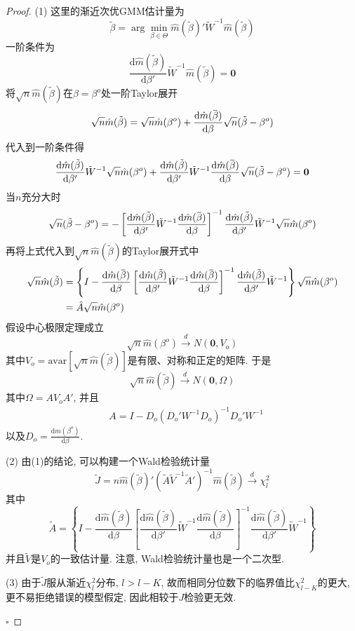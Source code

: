\documentclass[cn,12pt,math=mtpro2,citestyle=gb7714-2015,bibstyle=gb7714-2015,twocol,mode=simple]{elegantbook}
\newcommand{\overbar}[1]{\mkern 1.5mu\overline{\mkern-1.5mu#1\mkern-1.5mu}\mkern 1.5mu}
\newcommand{\tbeta}{\tilde{\beta}}
\newcommand{\hatm}{\hat{m}}
\newcommand{\dd}{\text{d}}
\begin{document}
\begin{proof}
  (1) 这里的渐近次优GMM估计量为
  $$\tbeta=\arg\min_{\beta\in\Theta}\hatm(\tbeta)'\tilde{W}^{-1}\hatm(\tbeta)$$
  一阶条件为
  $$\frac{\dd\hat{m}(\tbeta)}{\dd\beta'}\tilde{W}^{-1}\hatm(\tbeta)=\mathbf{0}$$
  将$\sqrt{n}\hatm(\tbeta)$在$\beta=\beta^o$处一阶Taylor展开
  $$\sqrt{n}\hatm(\tbeta)=\sqrt{n}\hatm(\beta^o)+\frac{\dd\hatm(\overbar{\beta})}{\dd\beta}\sqrt{n}(\tbeta-\beta^o)$$
  代入到一阶条件得
  $$\frac{\dd\hatm(\tbeta)}{\dd\beta'}\tilde{W}^{-1}\sqrt{n}\hatm(\beta^o)+\frac{\dd\hatm(\tbeta)}{\dd\beta'}\tilde{W}^{-1}\frac{\dd\hat{m}(\overbar{\beta})}{\dd\beta}\sqrt{n}(\tilde{\beta}-\beta^o)=\mathbf{0}$$
  当$n$充分大时
  $$\sqrt{n}(\tbeta-\beta^o)=-\left[\frac{\dd\hatm(\tbeta)}{\dd\beta'}\tilde{W}^{-1}\frac{\dd \hatm(\overbar{\beta})}{\dd\beta}\right]^{-1}\frac{\dd\hatm(\tilde{\beta})}{\dd\beta'}\tilde{W}^{-1}\sqrt{n}\hatm(\beta^o)$$
  再将上式代入到$\sqrt{n}\hatm(\tbeta)$的Taylor展开式中
  \begin{align*}
  \sqrt{n}\hatm(\tilde{\beta})&=\left\{I-\frac{\dd\hatm(\overbar{\beta})}{\dd\beta}\left[\frac{\dd\hatm(\tbeta)}{\dd\beta'}\tilde{W}^{-1}\frac{\dd\hatm(\overbar{\beta})}{\dd\beta}\right]^{-1}\frac{\dd\hatm(\tbeta)}{\dd\beta'}\tilde{W}^{-1}\right\}\sqrt{n}\hatm(\beta^o) \\
  &=\hat{A}\sqrt{n}\hat{m}(\beta^o)
  \end{align*}
  假设中心极限定理成立
  $$\sqrt{n}\hatm(\beta^o)\xrightarrow{d}N(\mathbf{0},V_o)$$
  其中$V_o=\text{avar}[\sqrt{n}\hatm(\tilde{\beta})]$是有限、对称和正定的矩阵. 于是
  $$\sqrt{n}\hatm(\tbeta)\xrightarrow{d}N(\mathbf{0},\Omega)$$
  其中$\Omega=AV_oA'$, 并且
  \begin{align*}
  &A=I-D_o(D_o'W^{-1}D_o)^{-1}D_o'W^{-1}
  \end{align*}
  以及$\displaystyle D_o=\frac{\dd m(\beta^o)}{\dd\beta}$.

  (2) 由(1)的结论, 可以构建一个Wald检验统计量
  $$\tilde{J}=n\hat{m}(\tbeta)'(\tilde{A}\tilde{V}^{-1}\tilde{A}')^{-1}\hat{m}(\tbeta)\xrightarrow{d}\chi^2_l$$
  其中$$\displaystyle \tilde{A}=\left\{I-\frac{\dd\hatm(\tilde{\beta})}{\dd\beta}\left[\frac{\dd\hatm(\tbeta)}{\dd\beta'}\tilde{W}^{-1}\frac{\dd\hatm(\tilde{\beta})}{\dd\beta}\right]^{-1}\frac{\dd\hatm(\tbeta)}{\dd\beta'}\tilde{W}^{-1}\right\}$$
  并且$\tilde{V}$是$V_o$的一致估计量. 注意, Wald检验统计量也是一个二次型.

  (3) 由于$\tilde{J}$服从渐近$\chi_l^2$分布, $l>l-K$, 故而相同分位数下的临界值比$\chi^2_{l-K}$的更大, 更不易拒绝错误的模型假定, 因此相较于$J$检验更无效.

  $\square$

\end{proof}
\end{document}
